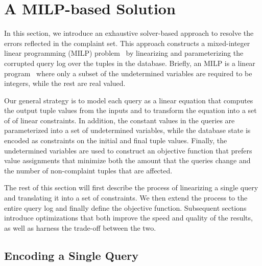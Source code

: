 
\section{A MILP-based Solution}
\label{sec:sol}

In this section, we introduce an exhaustive solver-based approach to 
resolve the errors reflected in the complaint set.
This approach constructs a mixed-integer linear 
programming (MILP) problem~\cite{milp} by linearizing and parameterizing the 
corrupted query log over the tuples in the database. 
Briefly, an MILP is a linear program~\cite{???} where only a subset of the undetermined variables
are required to be integers, while the rest are real valued.

Our general strategy is to model each query as a linear equation 
that computes the output tuple values from the inputs and to transform the
equation into a set of of linear constraints.   
In addition, the constant values in the queries are parameterized
into a set of undetermined variables, while the database state is encoded 
as constraints on the initial and final tuple values.
Finally, the undetermined variables are used to construct an objective function
that prefers value assignments that minimize both the amount that the queries change and
the number of non-complaint tuples that are affected. 

The rest of this section will first describe the process of linearizing a single query
and translating it into a set of constraints.  We then extend the process to the entire
query log and finally define the objective function.
Subsequent sections introduce optimizations that both
improve the speed and quality of the results, as well as harness the trade-off between the two. 








\subsection{Encoding a Single Query}%
\label{sec:linearize}

